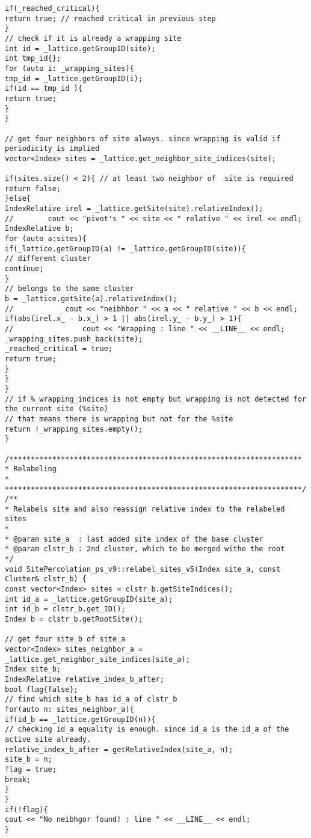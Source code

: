 \begin{lstlisting}[style=CStyle]
if(_reached_critical){
return true; // reached critical in previous step
}
// check if it is already a wrapping site
int id = _lattice.getGroupID(site);
int tmp_id{};
for (auto i: _wrapping_sites){
tmp_id = _lattice.getGroupID(i);
if(id == tmp_id ){
return true;
}
}

// get four neighbors of site always. since wrapping is valid if periodicity is implied
vector<Index> sites = _lattice.get_neighbor_site_indices(site);

if(sites.size() < 2){ // at least two neighbor of  site is required
return false;
}else{
IndexRelative irel = _lattice.getSite(site).relativeIndex();
//        cout << "pivot's " << site << " relative " << irel << endl;
IndexRelative b;
for (auto a:sites){
if(_lattice.getGroupID(a) != _lattice.getGroupID(site)){
// different cluster
continue;
}
// belongs to the same cluster
b = _lattice.getSite(a).relativeIndex();
//            cout << "neibhbor " << a << " relative " << b << endl;
if(abs(irel.x_ - b.x_) > 1 || abs(irel.y_ - b.y_) > 1){
//                cout << "Wrapping : line " << __LINE__ << endl;
_wrapping_sites.push_back(site);
_reached_critical = true;
return true;
}
}
}
// if %_wrapping_indices is not empty but wrapping is not detected for the current site (%site)
// that means there is wrapping but not for the %site
return !_wrapping_sites.empty();
}

/********************************************************************
* Relabeling
*
*********************************************************************/
/**
* Relabels site and also reassign relative index to the relabeled sites
*
* @param site_a  : last added site index of the base cluster
* @param clstr_b : 2nd cluster, which to be merged withe the root
*/
void SitePercolation_ps_v9::relabel_sites_v5(Index site_a, const Cluster& clstr_b) {
const vector<Index> sites = clstr_b.getSiteIndices();
int id_a = _lattice.getGroupID(site_a);
int id_b = clstr_b.get_ID();
Index b = clstr_b.getRootSite();

// get four site_b of site_a
vector<Index> sites_neighbor_a = _lattice.get_neighbor_site_indices(site_a);
Index site_b;
IndexRelative relative_index_b_after;
bool flag{false};
// find which site_b has id_a of clstr_b
for(auto n: sites_neighbor_a){
if(id_b == _lattice.getGroupID(n)){
// checking id_a equality is enough. since id_a is the id_a of the active site already.
relative_index_b_after = getRelativeIndex(site_a, n);
site_b = n;
flag = true;
break;
}
}
if(!flag){
cout << "No neibhgor found! : line " << __LINE__ << endl;
}


\end{lstlisting}
